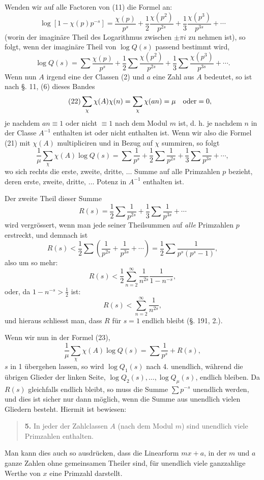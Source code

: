 \documentclass[11pt]{article}
\begin{document}
Wenden wir auf alle Factoren von (11) die Formel an:
\[
\log[1-\chi(p)p^{-s}]
=\frac{\chi(p)}{p^s}+\frac12\frac{\chi(p^2)}{p^{2s}}+\frac13\frac{\chi(p^3)}{p^{3s}}+\cdots
\]
(worin der imaginäre Theil des Logarithmus zwischen $\pm\pi i$ zu nehmen ist), so folgt, wenn der imaginäre Theil von $\log Q(s)$ passend bestimmt wird,
\begin{equation}\tag{21}
\log Q(s)=\sum\frac{\chi(p)}{p^s}+\frac12\sum\frac{\chi(p^2)}{p^{2s}}+\frac13\sum\frac{\chi(p^3)}{p^{3s}}+\cdots .
\end{equation}
Wenn nun $A$ irgend eine der Classen (2) und $a$ eine Zahl aus $A$ bedeutet, so ist nach §. 11, (6) dieses Bandes
\begin{equation}\tag{22}
\sum_\chi \chi(A)\chi(n)=\sum_\chi \chi(an)=\mu\quad\hbox{oder}=0,
\end{equation}
je nachdem $an\equiv1$ oder nicht $\equiv1$ nach dem Modul $m$ ist, d. h. je nachdem $n$ in der Classe $A^{-1}$ enthalten ist oder nicht enthalten ist. Wenn wir also die Formel (21) mit $\chi(A)$ multipliciren und in Bezug auf $\chi$ summiren, so folgt
\begin{equation}\tag{23}
\frac1\mu\sum_\chi \chi(A)\log Q(s)=
\sum\frac1{p^s}+\frac12\sum\frac1{p^{2s}}+\frac13\sum\frac1{p^{3s}}+\cdots,
\end{equation}
wo sich rechts die erste, zweite, dritte, $\ldots$ Summe auf alle Primzahlen $p$ bezieht, deren erste, zweite, dritte, $\ldots$ Potenz in $A^{-1}$ enthalten ist.

Der zweite Theil dieser Summe
\[
R(s)=\frac12\sum\frac1{p^{2s}}+\frac13\sum\frac1{p^{3s}}+\cdots
\]
wird vergrössert, wenn man jede seiner Theilsummen auf \emph{alle} Primzahlen $p$ erstreckt, und demnach ist
\[
R(s)<\frac12\sum\left(\frac1{p^{2s}}+\frac1{p^{3s}}+\cdots\right)
=\frac12\sum\frac1{p^s(p^s-1)},
\]
also um so mehr:
\[
R(s)<\frac12\sum_{n=2}^{\infty}\frac1{n^{2s}}\frac1{1-n^{-s}},
\]
oder, da $1-n^{-s}>\frac12$ ist:
\[
R(s)<\sum_{n=2}^{\infty}\frac1{n^{2s}},
\]
und hieraus schliesst man, dass $R$ für $s=1$ endlich bleibt (§. 191, 2.).

Wenn wir nun in der Formel (23),
\[
\frac1\mu\sum_\chi \chi(A)\log Q(s)=\sum\frac1{p^s}+R(s),
\]
$s$ in 1 übergehen lassen, so wird $\log Q_1(s)$ nach 4. unendlich, während die übrigen Glieder der linken Seite, $\log Q_2(s),\ldots,\log Q_\mu(s)$, endlich bleiben. Da $R(s)$ gleichfalls endlich bleibt, so muss die Summe $\sum p^{-s}$ unendlich werden, und dies ist sicher nur dann möglich, wenn die Summe aus unendlich vielen Gliedern besteht. Hiermit ist bewiesen:

\begin{quote}
\textbf{5.} In jeder der Zahlclassen $A$ (nach dem Modul $m$) sind unendlich viele Primzahlen enthalten.
\end{quote}

Man kann dies auch so ausdrücken, dass die Linearform $mx+a$, in der $m$ und $a$ ganze Zahlen ohne gemeinsamen Theiler sind, für unendlich viele ganzzahlige Werthe von $x$ eine Primzahl darstellt.
\end{document}
